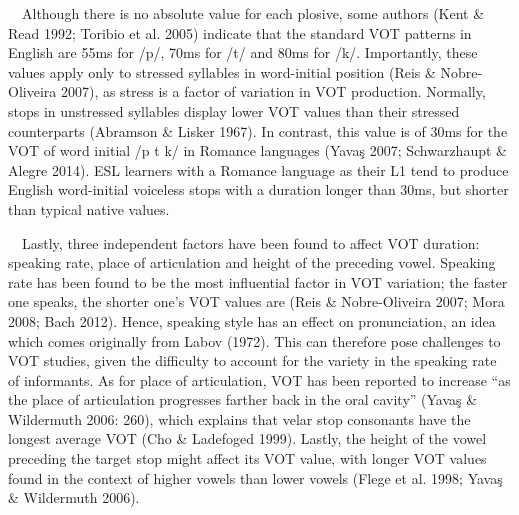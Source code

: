 \documentclass[11pt]{article}
\newenvironment{styleNormali}{\setlength\leftskip{0cm}\setlength\rightskip{0cm plus 1fil}\setlength\parindent{0cm}\setlength\parfillskip{0pt plus 1fil}\setlength\parskip{0cm plus 1pt}\writerlistparindent\writerlistleftskip\leavevmode\normalfont\normalsize\writerlistlabel\ignorespaces}{\unskip\vspace{0cm plus 1pt}\par}
\newcommand\writerlistleftskip{}
\newcommand\writerlistparindent{}
\newcommand\writerlistlabel{}
\begin{document}
\begin{styleNormali}
\ \ Although there is no absolute value for each plosive, some authors (Kent \& Read 1992; Toribio et al. 2005) indicate that the standard VOT patterns in English are 55ms for /p/, 70ms for /t/ and 80ms for /k/. Importantly, these values apply only to stressed syllables in word-initial position (Reis \& Nobre-Oliveira 2007), as stress is a factor of variation in VOT production. Normally, stops in unstressed syllables display lower VOT values than their stressed counterparts (Abramson \& Lisker 1967). In contrast, this value is of 30ms for the VOT of word initial /p t k/ in Romance languages (Yavaş 2007; Schwarzhaupt \& Alegre 2014). ESL learners with a Romance language as their L1 tend to produce English word-initial voiceless stops with a duration longer than 30ms, but shorter than typical native values. 
\end{styleNormali}


\begin{styleNormali}
\ \ Lastly, three independent factors have been found to affect VOT duration: speaking rate, place of articulation and height of the preceding vowel. Speaking rate has been found to be the most influential factor in VOT variation; the faster one speaks, the shorter one’s VOT values are (Reis \& Nobre-Oliveira 2007; Mora 2008; Bach 2012). Hence, speaking style has an effect on pronunciation, an idea which comes originally from Labov (1972). This can therefore pose challenges to VOT studies, given the difficulty to account for the variety in the speaking rate of informants. As for place of articulation, VOT has been reported to increase “as the place of articulation progresses farther back in the oral cavity” (Yavaş \& Wildermuth 2006: 260), which explains that velar stop consonants have the longest average VOT (Cho \& Ladefoged 1999). Lastly, the height of the vowel preceding the target stop might affect its VOT value, with longer VOT values found in the context of higher vowels than lower vowels (Flege et al. 1998; Yavaş \& Wildermuth 2006).
\end{styleNormali}
\end{document}
